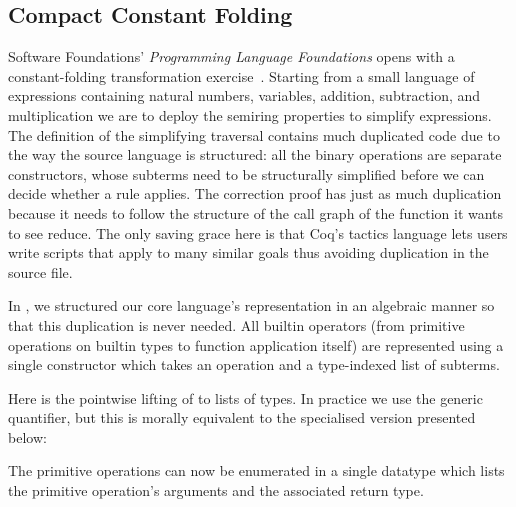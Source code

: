 \subsection{Compact Constant Folding}
\label{sec:design:constants}

Software Foundations' \emph{Programming Language Foundations}
opens with a constant-folding transformation exercise~\cite[Chapter~1]{Pierce:SF2}.
%
Starting from a small language of expressions containing natural numbers, variables, addition, subtraction, and multiplication we are to deploy the semiring properties to simplify expressions.
%
The definition of the simplifying traversal contains much duplicated code due to the way the source language is structured:
%
all the binary operations are separate constructors, whose subterms need to be structurally simplified before we can decide whether a rule applies.
%
The correction proof has just as much duplication because it needs to follow the structure of the call graph of the function it wants to see reduce.
%
The only saving grace here is that Coq's tactics language lets users write scripts that apply to many similar goals thus avoiding duplication in the source file.

In \Velo{}, we structured our core language's representation in an algebraic
manner so that this duplication is never needed.
%
All builtin operators (from primitive operations on builtin types to function
application itself) are represented using a single  constructor
which takes an operation and a type-indexed list of subterms.



Here  is the pointwise lifting of  to lists
of types. In practice we use the generic  quantifier, but this
is morally equivalent to the specialised version presented below:


The primitive operations can now be enumerated in a single datatype
 which lists the primitive operation's arguments and
the associated return type.

\begin{comment}
\IdrisData{Zero}---which takes no argument and returns a term of type \IdrisData{TyNat};
%
\IdrisData{Inc}---which takes an argument of type \IdrisData{TyNat} and returns a term
of type \IdrisData{TyNat};
%
and
%
\IdrisData{App}---which takes a function and an argument that corresponds to the type of the function's domain and returns a term that is the type of the function's co-domain.
\end{comment}

